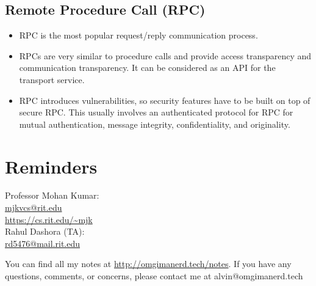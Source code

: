\documentclass{math}
\begin{document}
\subsection*{Remote Procedure Call (RPC)}
\begin{itemize}
  \item RPC is the most popular request/reply communication process.
  \item RPCs are very similar to procedure calls and provide access
  transparency and communication transparency. It can be considered as an API
  for the transport service.
  \item RPC introduces vulnerabilities, so security features have to be built on
  top of secure RPC. This usually involves an authenticated protocol for RPC
  for mutual authentication, message integrity, confidentiality, and
  originality.
\end{itemize}

\section*{Reminders}
\noindent Professor Mohan Kumar: \\
\url{mjkvcs@rit.edu} \\
\url{https://cs.rit.edu/~mjk} \\

\noindent Rahul Dashora (TA): \\
\url{rd5476@mail.rit.edu} \\

\begin{center}
  You can find all my notes at \url{http://omgimanerd.tech/notes}. If you have
  any questions, comments, or concerns, please contact me at
  alvin@omgimanerd.tech
\end{center}
\end{document}

